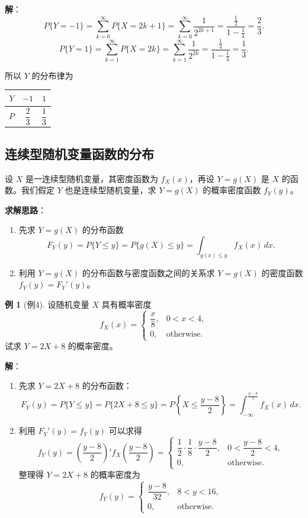 \documentclass[11pt,a4paper]{report}
\theoremstyle{definition}
\newtheorem{example}{例}[chapter]
\begin{document}
\textbf{解}：
\[
P\{Y=-1\} = \sum_{k=0}^{\infty}P\{X=2k+1\} = \sum_{k=0}^{\infty}\frac{1}{2^{2k+1}} = \frac{\frac{1}{2}}{1-\frac{1}{4}} = \boxed{\frac{2}{3}}.
\]
\[
P\{Y=1\} = \sum_{k=1}^{\infty}P\{X=2k\} = \sum_{k=1}^{\infty}\frac{1}{2^{2k}} = \frac{\frac{1}{4}}{1-\frac{1}{4}} = \boxed{\frac{1}{3}}.
\]

所以 $Y$ 的分布律为

\begin{table}[htbp]
\centering
\begin{tabular}{@{}ccc@{}}
\toprule
$Y$ & $-1$ & $1$ \\
\midrule
$P$ & $\dfrac{2}{3}$ & $\dfrac{1}{3}$ \\
\bottomrule
\end{tabular}
\end{table}

\subsection{连续型随机变量函数的分布}

设 $X$ 是一连续型随机变量，其密度函数为 $f_X(x)$，再设 $Y=g(X)$ 是 $X$ 的函数。我们假定 $Y$ 也是连续型随机变量，求 $Y=g(X)$ 的概率密度函数 $f_Y(y)$。

\textbf{求解思路}：
\begin{enumerate}[label=(\arabic*),leftmargin=2em]
    \item 先求 $Y=g(X)$ 的分布函数
    \[
    F_Y(y) = P\{Y \leq y\} = P\{g(X) \leq y\} = \int_{g(x)\leq y}f_X(x)\,dx.
    \]
    \item 利用 $Y=g(X)$ 的分布函数与密度函数之间的关系求 $Y=g(X)$ 的密度函数 $f_Y(y)=F_Y'(y)$。
\end{enumerate}

\begin{example}[例4]
设随机变量 $X$ 具有概率密度
\[
f_X(x) = \begin{cases} \dfrac{x}{8}, & 0 < x < 4, \\ 0, & \text{otherwise}. \end{cases}
\]
试求 $Y=2X+8$ 的概率密度。
\end{example}

\textbf{解}：
\begin{enumerate}[label=(\arabic*),leftmargin=2em]
    \item 先求 $Y=2X+8$ 的分布函数：
    \[
    F_Y(y) = P\{Y \leq y\} = P\{2X+8 \leq y\} = P\left\{X \leq \frac{y-8}{2}\right\} = \int_{-\infty}^{\frac{y-8}{2}}f_X(x)\,dx.
    \]
    
    \item 利用 $F_Y'(y)=f_Y(y)$ 可以求得
    \[
    f_Y(y) = \left(\frac{y-8}{2}\right)' f_X\left(\frac{y-8}{2}\right) = \begin{cases} \dfrac{1}{2} \cdot \dfrac{1}{8} \cdot \dfrac{y-8}{2}, & 0 < \dfrac{y-8}{2} < 4, \\ 0, & \text{otherwise}. \end{cases}
    \]
    整理得 $Y=2X+8$ 的概率密度为
    \[
    f_Y(y) = \begin{cases} \dfrac{y-8}{32}, & 8 < y < 16, \\ 0, & \text{otherwise}. \end{cases}
    \]
\end{enumerate}
\end{document}
